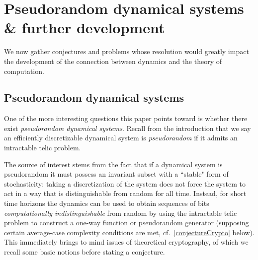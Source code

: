 \documentclass{amsart}
\theoremstyle{theorem}
\theoremstyle{remark}
\numberwithin{equation}{section}
\begin{document}
\section{Pseudorandom dynamical systems \& further development}\label{secProblems}

We now gather conjectures and problems whose resolution would greatly impact the development of the connection between dynamics and the theory of computation.

\subsection{Pseudorandom dynamical systems}

One of the more interesting questions this paper points toward is whether there exist \emph{pseudorandom dynamical systems}. Recall from the introduction that we say an efficiently discretizable dynamical system is \emph{pseudorandom} if it admits an intractable telic problem.

The source of interest stems from the fact that if a dynamical system is pseudorandom it must possess an invariant subset with a ``stable" form of stochasticity: taking a discretization of the system does not force the system to act in a way that is distinguishable from random for all time. Instead, for short time horizons the dynamics can be used to obtain sequences of bits \emph{computationally indistinguishable} from random by using the intractable telic problem to construct a one-way function or pseudorandom generator (supposing certain average-case complexity conditions are met, cf.\ \cref{conjectureCrypto} below).
This immediately brings to mind issues of theoretical cryptography, of which we recall some basic notions before stating a conjecture.
\end{document}
